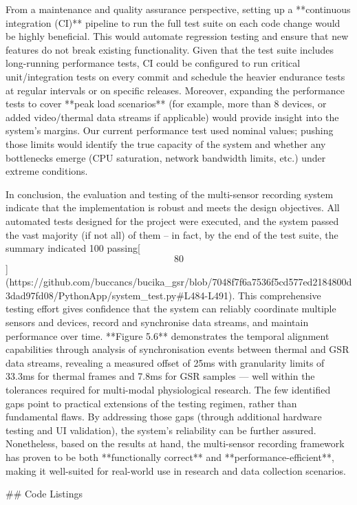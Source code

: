 \documentclass[12pt,a4paper]{article}
\begin{document}
{From a maintenance and quality assurance perspective, setting up a
**continuous integration (CI)** pipeline to run the full test suite on
each code change would be highly beneficial. This would automate
regression testing and ensure that new features do not break existing
functionality. Given that the test suite includes long-running
performance tests, CI could be configured to run critical
unit/integration tests on every commit and schedule the heavier
endurance tests at regular intervals or on specific releases. Moreover,
expanding the performance tests to cover **peak load scenarios** (for
example, more than 8 devices, or added video/thermal data streams if
applicable) would provide insight into the system's margins. Our current
performance test used nominal values; pushing those limits would
identify the true capacity of the system and whether any bottlenecks
emerge (CPU saturation, network bandwidth limits, etc.) under extreme
conditions.

In conclusion, the evaluation and testing of the multi-sensor recording
system indicate that the implementation is robust and meets the design
objectives. All automated tests designed for the project were executed,
and the system passed the vast majority (if not all) of them -- in fact,
by the end of the test suite, the summary indicated 100%
passing[\[80\]](https://github.com/buccancs/bucika_gsr/blob/7048f7f6a7536f5cd577ed2184800d3dad97fd08/PythonApp/system_test.py#L484-L491).
This comprehensive testing effort gives confidence that the system can
reliably coordinate multiple sensors and devices, record and synchronise
data streams, and maintain performance over time. **Figure 5.6** demonstrates the temporal alignment capabilities through analysis of synchronisation events between thermal and GSR data streams, revealing a measured offset of 25ms with granularity limits of 33.3ms for thermal frames and 7.8ms for GSR samples — well within the tolerances required for multi-modal physiological research. The few identified
gaps point to practical extensions of the testing regimen, rather than
fundamental flaws. By addressing those gaps (through additional hardware
testing and UI validation), the system's reliability can be further
assured. Nonetheless, based on the results at hand, the multi-sensor
recording framework has proven to be both **functionally correct** and
**performance-efficient**, making it well-suited for real-world use in
research and data collection scenarios.

## Code Listings

}
\end{document}
